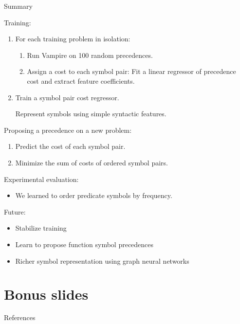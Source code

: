 \documentclass[notes]{beamer}
\begin{document}
\begin{frame}{Summary}

Training:
\begin{enumerate}
	\item For each training problem in isolation:
	\begin{enumerate}
		\item Run Vampire on 100 random precedences.
		\item Assign a cost to each symbol pair:
		Fit a linear regressor of precedence cost and extract feature coefficients.
	\end{enumerate}
	\item Train a symbol pair cost regressor.
	
	Represent symbols using simple syntactic features.
\end{enumerate}

Proposing a precedence on a new problem:
\begin{enumerate}
	\item Predict the cost of each symbol pair.
	\item Minimize the sum of costs of ordered symbol pairs.
\end{enumerate}

Experimental evaluation:
\begin{itemize}
	\item We learned to order predicate symbols by frequency.
\end{itemize}

Future:
\begin{itemize}
	\item Stabilize training
	\item Learn to propose function symbol precedences
	\item Richer symbol representation using graph neural networks
\end{itemize}

\end{frame}

\section{Bonus slides}

\begin{frame}[noframenumbering]
\sectionpage
\end{frame}

\begin{frame}[noframenumbering]{References}


\end{frame}
\end{document}
